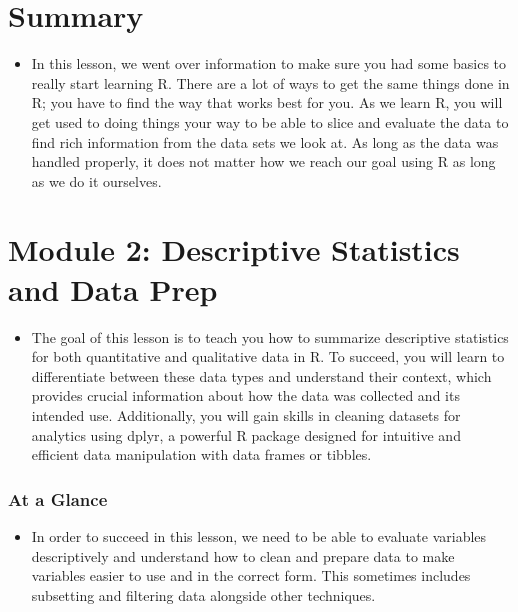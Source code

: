 \documentclass[
  letterpaper,
  DIV=11,
  numbers=noendperiod]{scrreprt}
\providecommand{\tightlist}{%
  \setlength{\itemsep}{0pt}\setlength{\parskip}{0pt}}\usepackage{longtable,booktabs,array}
\begin{document}

\chapter{Summary}\label{summary-1}

\begin{itemize}
\tightlist
\item
  In this lesson, we went over information to make sure you had some
  basics to really start learning R. There are a lot of ways to get the
  same things done in R; you have to find the way that works best for
  you. As we learn R, you will get used to doing things your way to be
  able to slice and evaluate the data to find rich information from the
  data sets we look at. As long as the data was handled properly, it
  does not matter how we reach our goal using R as long as we do it
  ourselves.
\end{itemize}


\chapter{Module 2: Descriptive Statistics and Data
Prep}\label{module-2-descriptive-statistics-and-data-prep}

\begin{itemize}
\tightlist
\item
  The goal of this lesson is to teach you how to summarize descriptive
  statistics for both quantitative and qualitative data in R. To
  succeed, you will learn to differentiate between these data types and
  understand their context, which provides crucial information about how
  the data was collected and its intended use. Additionally, you will
  gain skills in cleaning datasets for analytics using dplyr, a powerful
  R package designed for intuitive and efficient data manipulation with
  data frames or tibbles.
\end{itemize}

\subsection{At a Glance}\label{at-a-glance-1}

\begin{itemize}
\tightlist
\item
  In order to succeed in this lesson, we need to be able to evaluate
  variables descriptively and understand how to clean and prepare data
  to make variables easier to use and in the correct form. This
  sometimes includes subsetting and filtering data alongside other
  techniques.
\end{itemize}
\end{document}
